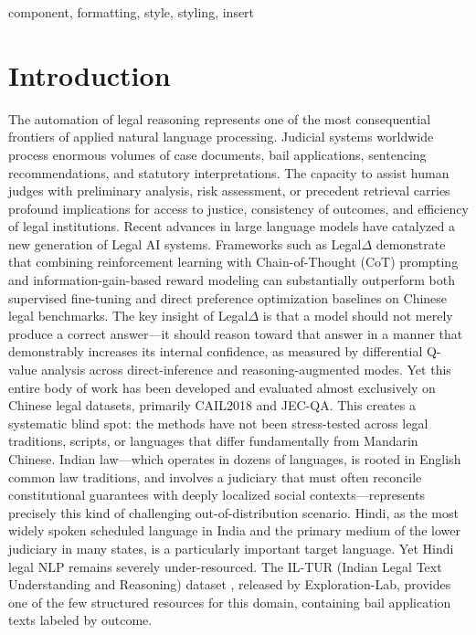 \documentclass[conference]{IEEEtran}
\begin{document}
\begin{IEEEkeywords}
component, formatting, style, styling, insert
\end{IEEEkeywords}

\section{Introduction}
The automation of legal reasoning represents one of the most consequential frontiers of applied natural language processing. Judicial systems worldwide process enormous volumes of case documents, bail applications, sentencing recommendations, and statutory interpretations. The capacity to assist human judges with preliminary analysis, risk assessment, or precedent retrieval carries profound implications for access to justice, consistency of outcomes, and efficiency of legal institutions.
Recent advances in large language models have catalyzed a new generation of Legal AI systems. Frameworks such as Legal$\Delta$ \cite{legaldelta} demonstrate that combining reinforcement learning with Chain-of-Thought (CoT) prompting and information-gain-based reward modeling can substantially outperform both supervised fine-tuning and direct preference optimization baselines on Chinese legal benchmarks. The key insight of Legal$\Delta$ is that a model should not merely produce a correct answer—it should reason toward that answer in a manner that demonstrably increases its internal confidence, as measured by differential Q-value analysis across direct-inference and reasoning-augmented modes.
Yet this entire body of work has been developed and evaluated almost exclusively on Chinese legal datasets, primarily CAIL2018 and JEC-QA. This creates a systematic blind spot: the methods have not been stress-tested across legal traditions, scripts, or languages that differ fundamentally from Mandarin Chinese. Indian law—which operates in dozens of languages, is rooted in English common law traditions, and involves a judiciary that must often reconcile constitutional guarantees with deeply localized social contexts—represents precisely this kind of challenging out-of-distribution scenario.
Hindi, as the most widely spoken scheduled language in India and the primary medium of the lower judiciary in many states, is a particularly important target language. Yet Hindi legal NLP remains severely under-resourced. The IL-TUR (Indian Legal Text Understanding and Reasoning) dataset \cite{iltur}, released by Exploration-Lab, provides one of the few structured resources for this domain, containing bail application texts labeled by outcome.
\end{document}
